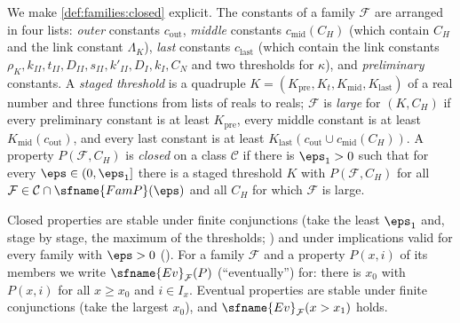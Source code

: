\begin{definition}\label{pf:linkG:closed}
We make \cref{def:families:closed} explicit. The constants of a family $\mathcal F$ are arranged in four lists:
\emph{outer} constants $c_{\mathrm{out}}$, \emph{middle} constants $c_{\mathrm{mid}}(C_H)$ (which contain $C_H$ and
the link constant $\Lambda_K$), \emph{last} constants $c_{\mathrm{last}}$ (which contain the link constants
$\rho_K,k_{II},t_{II},D_{II},s_{II},k'_{II},D_I,k_I,C_N$ and two thresholds for $\kappa$), and
\emph{preliminary} constants. A \emph{staged threshold} is a quadruple
$K=(K_{\mathrm{pre}},K_t,K_{\mathrm{mid}},K_{\mathrm{last}})$ of a real number and three functions from lists of
reals to reals; $\mathcal F$ is \emph{large} for $(K,C_H)$ if every preliminary constant is at least
$K_{\mathrm{pre}}$, every middle constant is at least $K_{\mathrm{mid}}(c_{\mathrm{out}})$, and every last constant
is at least $K_{\mathrm{last}}(c_{\mathrm{out}}\cup c_{\mathrm{mid}}(C_H))$. A property $P(\mathcal F,C_H)$ is
\emph{closed} on a class $\mathcal C$ if there is $\eps_1>0$ such that for every $\eps\in(0,\eps_1]$ there is a
staged threshold $K$ with $P(\mathcal F,C_H)$ for all $\mathcal F\in\mathcal C\cap\sfname{FamP}(\eps)$ and all
$C_H$ for which $\mathcal F$ is large.
\end{definition}

Closed properties are stable under finite conjunctions (take the least $\eps_1$ and, stage by stage, the maximum
of the thresholds; ) and under implications valid for every family
with $\eps>0$ (). For a family $\mathcal F$ and a property $P(x,i)$
of its members we write $\sfname{Ev}_{\mathcal F}(P)$ (``eventually'') for: there is $x_0$ with $P(x,i)$ for all
$x\ge x_0$ and $i\in I_x$. Eventual properties are stable under finite conjunctions (take the largest $x_0$), and
$\sfname{Ev}_{\mathcal F}(x>x_1)$ holds.

